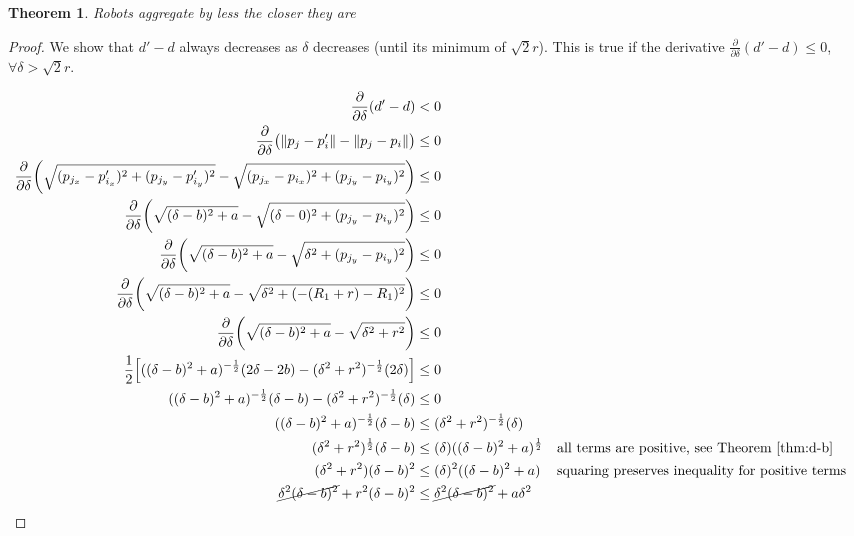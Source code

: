 \documentclass[conference]{IEEEtran}
\newtheorem{theorem}{Theorem}
\begin{document}
  \begin{theorem} \label{thm:decrease}
    Robots aggregate by less the closer they are
  \end{theorem}
  \begin{proof}

    We show that $d'-d$ always decreases as $\delta$ decreases (until its minimum of $\sqrt{2}r$). This is true if the derivative $\frac{\partial}{\partial\delta}(d'-d) \leq 0$, $\forall \delta>\sqrt{2}r$.

    \begin{align*}
      \frac{\partial}{\partial\delta}(d'-d) &< 0 \\
      \frac{\partial}{\partial\delta}\big(\lVert p_j - p'_i \rVert - \lVert p_j - p_i \rVert\big) &\leq 0 \\
      \frac{\partial}{\partial\delta}\bigg(\sqrt{(p_{j_x} - p'_{i_x})^2 + (p_{j_y} - p'_{i_y})^2} - \sqrt{(p_{j_x} - p_{i_x})^2 + (p_{j_y} - p_{i_y})^2}\bigg) &\leq 0 \\
      \frac{\partial}{\partial\delta}\bigg(\sqrt{(\delta - b)^2 + a} - \sqrt{(\delta- 0)^2 + (p_{j_y} - p_{i_y})^2}\bigg) &\leq 0 \\
      \frac{\partial}{\partial\delta}\bigg(\sqrt{(\delta - b)^2 + a} - \sqrt{\delta^2 + (p_{j_y} - p_{i_y})^2}\bigg) &\leq 0 \\
      \frac{\partial}{\partial\delta}\bigg(\sqrt{(\delta-b)^2 + a} - \sqrt{\delta^2 + (-(R_1+r) - R_1)^2}\bigg) &\leq 0 \\
      \frac{\partial}{\partial\delta}\bigg(\sqrt{(\delta-b)^2 + a} - \sqrt{\delta^2 + r^2}\bigg) &\leq 0 \\
      \frac{1}{2}\Big[((\delta-b)^2 + a)^{-\frac{1}{2}}(2\delta-2b) - (\delta^2 + r^2)^{-\frac{1}{2}}(2\delta)\Big] &\leq 0 \\
      ((\delta-b)^2 + a)^{-\frac{1}{2}}(\delta-b) - (\delta^2 + r^2)^{-\frac{1}{2}}(\delta) &\leq 0 \\
      ((\delta-b)^2 + a)^{-\frac{1}{2}}(\delta-b) &\leq (\delta^2 + r^2)^{-\frac{1}{2}}(\delta) \\
      (\delta^2 + r^2)^{\frac{1}{2}}(\delta-b) &\leq (\delta)((\delta-b)^2 + a)^{\frac{1}{2}} && \text{all terms are positive, see Theorem \ref{thm:d-b}} \\
      (\delta^2 + r^2)(\delta-b)^2 &\leq (\delta)^2((\delta-b)^2 + a) && \text{squaring preserves inequality for positive terms} \\
      \cancel{\delta^2(\delta-b)^2} + r^2(\delta-b)^2 &\leq \cancel{\delta^2(\delta-b)^2} + a\delta^2 \\

\end{align*}
\end{proof}
\end{document}
